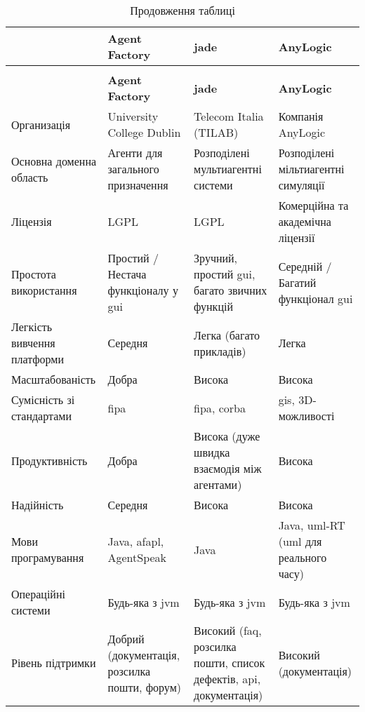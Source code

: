 {
	\small
	\tabulinesep=1.2mm
	\begin{longtabu} to \textwidth {|X[2,l]|X[2,l]|X[3,l]|X[3,l]|}
  		\caption{Порівняння платформ для розробки \acrshort{mas}~\cite{Kravari2015}}
  		\label{tab:mas_platform_comparsion} \\
		\hline
		& \textbf{Agent Factory} & \textbf{\acrshort{jade}} & \textbf{AnyLogic} \\\hline\endfirsthead
  		\caption*{Продовження таблиці \thetable{}}\\
		\hline
		& \textbf{Agent Factory} & \textbf{\acrshort{jade}} & \textbf{AnyLogic} \\\hline\endhead
		Организація & University College Dublin & Telecom Italia (TILAB) & Компанія AnyLogic \\\hline
		Основна доменна область & Агенти для загального призначення & Розподілені мультиагентні системи & Розподілені мільтиагентні симуляції \\\hline
		Ліцензія & LGPL & LGPL & Комерційна та академічна ліцензії \\
		\hline
		Простота використання & Простий / Нестача функціоналу у \acrshort{gui} & Зручний, простий \acrshort{gui}, багато звичних функцій & Середній / Багатий функціонал \acrshort{gui} \\\hline
		Легкість вивчення платформи & Середня & Легка (багато прикладів) & Легка \\\hline
		Масштабованість & Добра & Висока & Висока \\\hline
		Сумісність зі стандартами & \acrshort{fipa} & \acrshort{fipa}, \acrshort{corba} & \acrshort{gis}, 3D-можливості \\
		\hline
		Продуктивність & Добра & Висока (дуже швидка взаємодія між агентами) & Висока \\\hline
		Надійність & Середня & Висока & Висока \\\hline
		Мови програмування & Java, \acrshort{afapl}, AgentSpeak & Java & Java, \acrshort{uml}-RT (\acrshort{uml} для реального часу) \\\hline
		Операційні системи & Будь-яка з \acrshort{jvm} & Будь-яка з \acrshort{jvm} & Будь-яка з \acrshort{jvm} \\
		\hline
		Рівень підтримки & Добрий (документація, розсилка пошти, форум) & Високий (\acrshort{faq}, розсилка пошти, список дефектів, \acrshort{api}, документація) & Високий (документація) \\\hline

\end{longtabu}}
